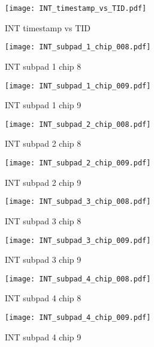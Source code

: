 \documentclass[a4paper,11pt]{article}
\begin{document}
\begin{figure}[htbp] \centering\texttt{[image: INT\_timestamp\_vs\_TID.pdf]}\caption{INT timestamp vs TID} \end{figure}
\begin{figure}[htbp] \centering\texttt{[image: INT\_subpad\_1\_chip\_008.pdf]}\caption{INT subpad 1 chip 8} \end{figure}
\begin{figure}[htbp] \centering\texttt{[image: INT\_subpad\_1\_chip\_009.pdf]}\caption{INT subpad 1 chip 9} \end{figure}
\begin{figure}[htbp] \centering\texttt{[image: INT\_subpad\_2\_chip\_008.pdf]}\caption{INT subpad 2 chip 8} \end{figure}
\begin{figure}[htbp] \centering\texttt{[image: INT\_subpad\_2\_chip\_009.pdf]}\caption{INT subpad 2 chip 9} \end{figure}
\begin{figure}[htbp] \centering\texttt{[image: INT\_subpad\_3\_chip\_008.pdf]}\caption{INT subpad 3 chip 8} \end{figure}
\begin{figure}[htbp] \centering\texttt{[image: INT\_subpad\_3\_chip\_009.pdf]}\caption{INT subpad 3 chip 9} \end{figure}
\begin{figure}[htbp] \centering\texttt{[image: INT\_subpad\_4\_chip\_008.pdf]}\caption{INT subpad 4 chip 8} \end{figure}
\begin{figure}[htbp] \centering\texttt{[image: INT\_subpad\_4\_chip\_009.pdf]}\caption{INT subpad 4 chip 9} \end{figure}
\end{document}
